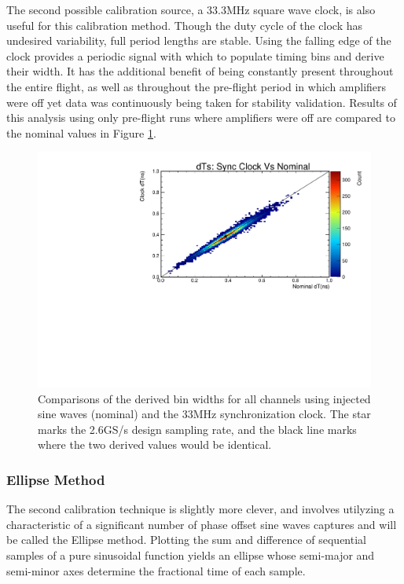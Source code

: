 		The second possible calibration source, a 33.3MHz square wave clock, is also useful for this calibration method.  Though the duty cycle of the clock has undesired variability, full period lengths are stable.  Using the falling edge of the clock provides a periodic signal with which to populate timing bins and derive their width.  It has the additional benefit of being constantly present throughout the entire flight, as well as throughout the pre-flight period in which amplifiers were off yet data was continuously being taken for stability validation.  Results of this analysis using only pre-flight runs where amplifiers were off are compared to the nominal values in Figure \ref{fig:dTNominalVsSyncClock}.
		
		
	\begin{figure}
		\includegraphics[width=\textwidth]{figures/nominalDtVsSyncClockDt}
		\caption{Comparisons of the derived bin widths for all channels using injected sine waves (nominal) and the 33MHz synchronization clock.  The star marks the 2.6GS/s design sampling rate, and the black line marks where the two derived values would be identical.}
		\label{fig:dTNominalVsSyncClock}
	\end{figure}


	\subsubsection{Ellipse Method}	
		The second calibration technique is slightly more clever, and involves utilyzing a characteristic of a significant number of phase offset sine waves captures and will be called the Ellipse method.  Plotting the sum and difference of sequential samples of a pure sinusoidal function yields an ellipse whose semi-major and semi-minor axes determine the fractional time of each sample.  
		
